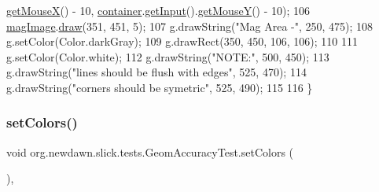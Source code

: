 \begin{DoxyCode}
      \mbox{\hyperlink{classorg_1_1newdawn_1_1slick_1_1_input_a59e2e96e215f9b8510ca42afec448c5e}{getMouseX}}() - 10, \mbox{\hyperlink{classorg_1_1newdawn_1_1slick_1_1tests_1_1_geom_accuracy_test_aa36ef5e207393c1e48bdc579da524cf0}{container}}.\mbox{\hyperlink{classorg_1_1newdawn_1_1slick_1_1_game_container_a6042fd06c54872f9f791bd33beffec88}{getInput}}().\mbox{\hyperlink{classorg_1_1newdawn_1_1slick_1_1_input_abf405c2d30fa7ede5a8d8619c6737a76}{getMouseY}}() - 10);
106         \mbox{\hyperlink{classorg_1_1newdawn_1_1slick_1_1tests_1_1_geom_accuracy_test_a29113b87453f7bebdf3ced47b8055164}{magImage}}.\mbox{\hyperlink{classorg_1_1newdawn_1_1slick_1_1_image_a9bddcca05c7140ab45df8ac5b250b6cd}{draw}}(351, 451, 5);
107         g.drawString(\textcolor{stringliteral}{"Mag Area -"}, 250, 475);
108         g.setColor(Color.darkGray);
109         g.drawRect(350, 450, 106, 106);
110         
111         g.setColor(Color.white);
112         g.drawString(\textcolor{stringliteral}{"NOTE:"}, 500, 450);
113         g.drawString(\textcolor{stringliteral}{"lines should be flush with edges"}, 525, 470);
114         g.drawString(\textcolor{stringliteral}{"corners should be symetric"}, 525, 490);
115         
116     \}
\end{DoxyCode}
\mbox{\label{classorg_1_1newdawn_1_1slick_1_1tests_1_1_geom_accuracy_test_a1ac89c93b981e42acf9fe705bfb46461}} 
\subsubsection{\texorpdfstring{set\+Colors()}{setColors()}}
{\footnotesize\ttfamily void org.\+newdawn.\+slick.\+tests.\+Geom\+Accuracy\+Test.\+set\+Colors (\begin{DoxyParamCaption}{ }\end{DoxyParamCaption})\hspace{0.3cm}{\ttfamily [inline]}, {\ttfamily [private]}}

